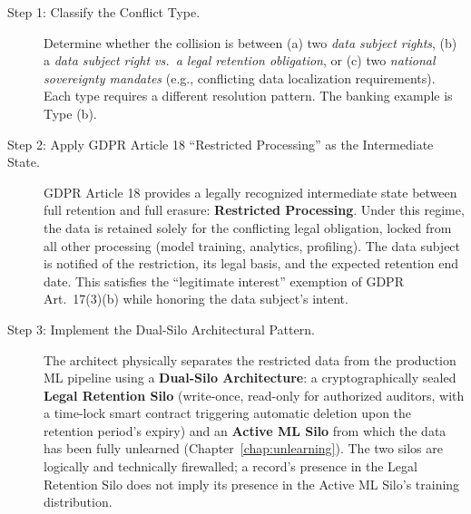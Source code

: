 \begin{description}
  \item[Step 1: Classify the Conflict Type.]
    Determine whether the collision is between (a) two \emph{data subject rights}, (b) a \emph{data subject right vs.\ a legal retention obligation}, or (c) two \emph{national sovereignty mandates} (e.g., conflicting data localization requirements). Each type requires a different resolution pattern. The banking example is Type (b).

  \item[Step 2: Apply GDPR Article 18 ``Restricted Processing'' as the Intermediate State.]
    GDPR Article 18 provides a legally recognized intermediate state between full retention and full erasure: \textbf{Restricted Processing}. Under this regime, the data is retained solely for the conflicting legal obligation, locked from all other processing (model training, analytics, profiling). The data subject is notified of the restriction, its legal basis, and the expected retention end date. This satisfies the ``legitimate interest'' exemption of GDPR Art.~17(3)(b) while honoring the data subject's intent.

  \item[Step 3: Implement the Dual-Silo Architectural Pattern.]
    The architect physically separates the restricted data from the production ML pipeline using a \textbf{Dual-Silo Architecture}: a cryptographically sealed \textbf{Legal Retention Silo} (write-once, read-only for authorized auditors, with a time-lock smart contract triggering automatic deletion upon the retention period's expiry) and an \textbf{Active ML Silo} from which the data has been fully unlearned (Chapter~\ref{chap:unlearning}). The two silos are logically and technically firewalled; a record's presence in the Legal Retention Silo does not imply its presence in the Active ML Silo's training distribution.
\end{description}

